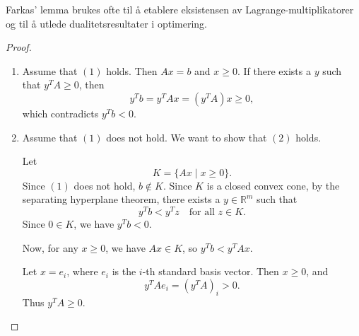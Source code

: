 Farkas' lemma brukes ofte til å etablere eksistensen av Lagrange-multiplikatorer og til å utlede dualitetsresultater i optimering.

\begin{proof}
	\begin{enumerate}
		\item[] Assume that \((1)\) holds. Then \(Ax = b\) and \(x \ge 0\). If there exists a \(y\) such that \(y^T A \ge 0\), then
		      \[
			      y^T b = y^T Ax = (y^T A)x \ge 0,
		      \]
		      which contradicts \(y^T b < 0\).
		\item[] Assume that \((1)\) does not hold. We want to show that \((2)\) holds.

		      Let
		      \[
			      K = \{Ax \mid x \ge 0\}.
		      \]
		      Since \((1)\) does not hold, \(b \notin K\). Since \(K\) is a closed convex cone, by the separating hyperplane theorem, there exists a \(y \in \mathbb{R}^m\) such that
		      \[
			      y^T b < y^T z \quad \text{for all } z \in K.
		      \]
		      Since \(0 \in K\), we have \(y^T b < 0\).

		      Now, for any \(x \ge 0\), we have \(Ax \in K\), so \(y^T b < y^T Ax\).

		      Let \(x = e_i\), where \(e_i\) is the \(i\)-th standard basis vector. Then \(x \ge 0\), and
		      \[
			      y^T A e_i = (y^T A)_i > 0.
		      \]
		      Thus \(y^T A \ge 0\).
	\end{enumerate}

	\begin{center}
	\end{center}


\end{proof}
